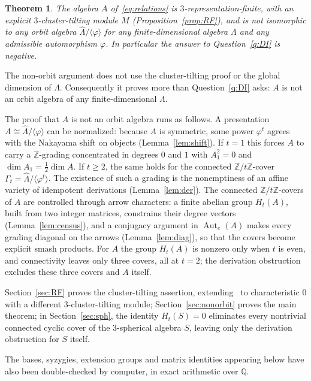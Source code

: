 \documentclass[11pt]{amsart}
\theoremstyle{plain}
\newtheorem{theorem}{Theorem}
\theoremstyle{definition}
\DeclareMathOperator{\Aut}{Aut}
\newcommand{\rep}{\widehat{\Lambda}}
\newcommand{\ZZ}{\mathbb{Z}}
\begin{document}
\begin{theorem}\label{thm:main}
The algebra $A$ of~\eqref{eq:relations} is $3$-representation-finite, with an explicit $3$-cluster-tilting
module $M$ (Proposition~\textup{\ref{prop:RF}}), and is not isomorphic to any orbit algebra
$\rep/\langle\varphi\rangle$ for any finite-dimensional algebra $\Lambda$ and any admissible automorphism
$\varphi$. In particular the answer to Question~\textup{\ref{q:DI}} is negative.
\end{theorem}

The non-orbit argument does not use the cluster-tilting proof or the global dimension of $\Lambda$.
Consequently it proves more than Question~\ref{q:DI} asks: $A$ is not an orbit algebra of any
finite-dimensional $\Lambda$.

The proof that $A$ is not an orbit algebra runs as follows. A presentation $A\cong\rep/\langle\varphi\rangle$
can be normalized: because $A$ is symmetric, some power $\varphi^t$ agrees with the Nakayama shift on objects
(Lemma~\ref{lem:shift}). If $t=1$ this forces $A$ to carry a $\ZZ$-grading concentrated in degrees $0$ and $1$
with $A_1^2=0$ and $\dim A_1=\tfrac12\dim A$. If $t\ge 2$, the same holds for the connected $\ZZ/t\ZZ$-cover
$\Gamma_t=\rep/\langle\varphi^t\rangle$. The existence of such a grading is the nonemptiness of an affine
variety of idempotent derivations (Lemma~\ref{lem:der}). The connected $\ZZ/t\ZZ$-covers of $A$ are controlled
through arrow characters: a finite abelian group $H_t(A)$, built from two integer matrices, constrains their
degree vectors (Lemma~\ref{lem:census}), and a conjugacy argument in $\Aut_e(A)$ makes every grading diagonal
on the arrows (Lemma~\ref{lem:diag}), so that the covers become explicit smash products. For $A$ the group
$H_t(A)$ is nonzero only when $t$ is even, and connectivity leaves only three covers, all at $t=2$; the
derivation obstruction excludes these three covers and $A$ itself.

Section~\ref{sec:RF} proves the cluster-tilting assertion, extending~\cite{BM} to characteristic $0$ with a
different $3$-cluster-tilting module; Section~\ref{sec:nonorbit} proves the main theorem; in
Section~\ref{sec:sph}, the identity $H_t(S)=0$ eliminates every nontrivial connected cyclic cover of the
$3$-spherical algebra $S$, leaving only the derivation obstruction for $S$ itself.

The bases, syzygies, extension groups and matrix identities appearing below have also been double-checked by
computer, in exact arithmetic over $\mathbb{Q}$.
\end{document}
